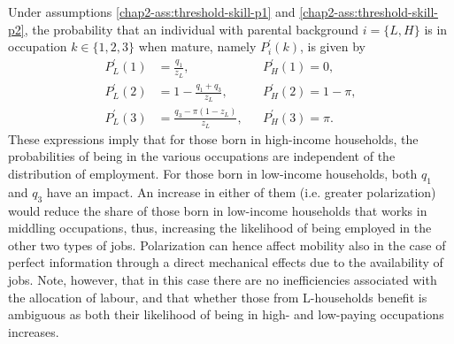 Under assumptions \ref{chap2-ass:threshold-skill-p1} and \ref{chap2-ass:threshold-skill-p2}, the
probability that an individual with parental background $i=\{L,H\}$ is in occupation $k\in\{1,2,3\}$ when mature, namely $P^\prime_i(k)$, is given by
\begin{align*}
    P^\prime_L(1) &=\frac{q_1}{z_L}, &&P^\prime_H(1) = 0,\\
    P^\prime_L(2) &=1-\frac{q_1+q_3}{z_{L}}, &&P^\prime_H(2) = 1-\pi,\\
    P^\prime_L(3) &=\frac{q_{3}-\pi (1-z_{L})}{z_{L}}, &&P^\prime_H(3) = \pi.
\end{align*}
These expressions imply that for those born in high-income households, the probabilities of being in the various occupations are independent of the distribution of employment. For those born in low-income households, both $q_1$ and $q_3$ have an impact. An increase in either of them (i.e. greater polarization) would reduce the share of those born in low-income households that works in middling occupations, thus, increasing the likelihood of being employed in the other two types of jobs. Polarization can hence affect mobility also in the case of perfect information through a direct mechanical effects due to the availability of jobs. Note, however, that in this case there are no inefficiencies associated with the allocation of labour, and that whether those from L-households benefit is ambiguous as both their likelihood of being in high- and low-paying occupations increases.

